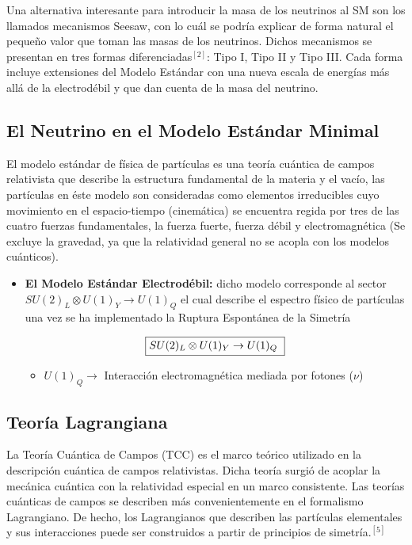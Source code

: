 \documentclass[12pt]{article}
\begin{document}
Una alternativa interesante para introducir la masa de los neutrinos al SM son los llamados mecanismos Seesaw, con lo cuál se podría explicar de forma natural el pequeño valor que toman las masas de los neutrinos. Dichos mecanismos se presentan en tres formas diferenciadas$^{[2]}$: Tipo I, Tipo II y Tipo III. Cada forma incluye extensiones del Modelo Estándar con una nueva escala de energías más allá de la electrodébil y que dan cuenta de la masa del neutrino.

\subsection{\textbf{El Neutrino en el Modelo Estándar Minimal}} El modelo estándar de física de partículas es una teoría cuántica de campos relativista que describe la estructura fundamental de la materia y el vacío, las partículas en éste modelo son consideradas como elementos irreducibles cuyo movimiento en el espacio-tiempo (cinemática) se encuentra regida por tres de las cuatro fuerzas fundamentales, la fuerza fuerte, fuerza débil y electromagnética (Se excluye la gravedad, ya que la relatividad general no se acopla con los modelos cuánticos).


\begin{itemize}
\item \textbf {El Modelo Estándar Electrodébil:} dicho modelo corresponde al  sector \(SU(2)_L\otimes U(1)_Y \rightarrow U(1)_Q \) el cual describe el espectro físico de partículas una vez se ha implementado la Ruptura Espontánea de la Simetría

\begin{equation}
\fbox{$SU(2)_L\otimes U(1)_Y \rightarrow U(1)_Q$ }
\label{eq:1}
\end{equation} 

\begin{itemize}
\item \(U(1)_Q \rightarrow \) Interacción electromagnética mediada por fotones (\(\nu \))
\end{itemize} 
\end{itemize} 


\subsection{Teoría Lagrangiana}


La Teoría Cuántica de Campos (TCC) es el marco teórico utilizado en la descripción cuántica de campos relativistas. Dicha teoría surgió de acoplar la mecánica cuántica con la relatividad especial en un marco consistente. Las teorías cuánticas de campos se describen más convenientemente en el formalismo Lagrangiano. De hecho, los Lagrangianos que describen las partículas elementales y sus interacciones puede ser construidos a partir de principios de simetría.$^{[5]}$ \\
\end{document}
